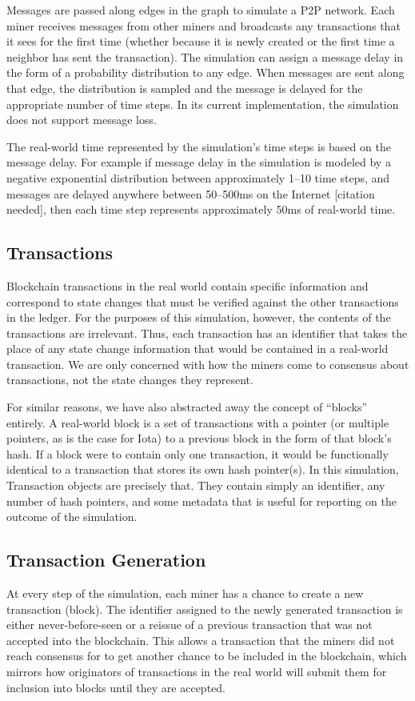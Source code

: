\documentclass[letterpaper,11pt]{article}
\begin{document}
Messages are passed along edges in the graph to simulate a P2P network. Each miner receives messages from other miners and broadcasts any transactions that it sees for the first time (whether because it is newly created or the first time a neighbor has sent the transaction). The simulation can assign a message delay in the form of a probability distribution to any edge. When messages are sent along that edge, the distribution is sampled and the message is delayed for the appropriate number of time steps. In its current implementation, the simulation does not support message loss.

The real-world time represented by the simulation's time steps is based on the message delay. For example if message delay in the simulation is modeled by a negative exponential distribution between approximately 1--10 time steps, and messages are delayed anywhere between 50--500ms on the Internet [citation needed], then each time step represents approximately 50ms of real-world time.

\subsection{Transactions}
Blockchain transactions in the real world contain specific information and correspond to state changes that must be verified against the other transactions in the ledger. For the purposes of this simulation, however, the contents of the transactions are irrelevant. Thus, each transaction has an identifier that takes the place of any state change information that would be contained in a real-world transaction. We are only concerned with how the miners come to consensus about transactions, not the state changes they represent. 

For similar reasons, we have also abstracted away the concept of ``blocks'' entirely. A real-world block is a set of transactions with a pointer (or multiple pointers, as is the case for Iota) to a previous block in the form of that block's hash. If a block were to contain only one transaction, it would be functionally identical to a transaction that stores its own hash pointer(s). In this simulation, Transaction objects are precisely that. They contain simply an identifier, any number of hash pointers, and some metadata that is useful for reporting on the outcome of the simulation.

\subsection{Transaction Generation}
At every step of the simulation, each miner has a chance to create a new transaction (block). The identifier assigned to the newly generated transaction is either never-before-seen or a reissue of a previous transaction that was not accepted into the blockchain. This allows a transaction that the miners did not reach consensus for to get another chance to be included in the blockchain, which mirrors how originators of transactions in the real world will submit them for inclusion into blocks until they are accepted.
\end{document}
